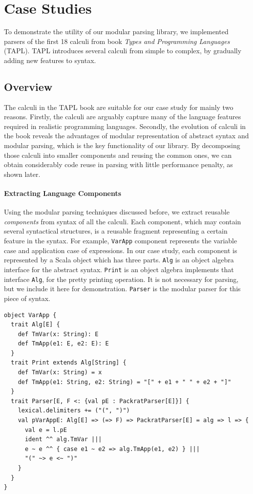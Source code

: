 \section{Case Studies}\label{sec:casestudy}


To demonstrate the utility of our modular parsing library, we
implemented parsers of the first 18 calculi from book \textit{Types
  and Programming Languages} (TAPL). TAPL introduces several
calculi from simple to complex, by gradually adding new features to
syntax. 

\subsection{Overview}\label{subsec:cs-overview}

The calculi in the TAPL book are suitable for our case study for mainly two reasons.
Firstly, the calculi are arguably capture many of the language features 
required in realistic programming languages. Secondly, the evolution of
calculi in the book reveals the advantages of modular representation
of abstract syntax and modular parsing, which is the key functionality
of our library. By decomposing those calculi into smaller components
and reusing the common ones, we can obtain considerably code reuse in
parsing with little performance penalty, as shown later.

\paragraph{Extracting Language Components}
Using the modular parsing techniques discussed before, we extract
reusable \textit{components} from syntax of all the calculi. Each
component, which may contain several syntactical structures, is a
reusable fragment representing a certain feature in the syntax. For
example, \lstinline{VarApp} component represents the variable case and
application case of expressions. In our case study, each component is
represented by a Scala object which has three parts. \lstinline{Alg}
is an object algebra interface for the abstract syntax.
\lstinline{Print} is an object algebra implements that interface
\lstinline{Alg}, for the pretty printing operation. It is not
necessary for parsing, but we include it here for demonstration.
\lstinline{Parser} is the modular parser for this piece of syntax.

\begin{lstlisting}
object VarApp {
  trait Alg[E] {
    def TmVar(x: String): E
    def TmApp(e1: E, e2: E): E
  }
  trait Print extends Alg[String] {
    def TmVar(x: String) = x
    def TmApp(e1: String, e2: String) = "[" + e1 + " " + e2 + "]"
  }
  trait Parser[E, F <: {val pE : PackratParser[E]}] {
    lexical.delimiters += ("(", ")")
    val pVarAppE: Alg[E] => (=> F) => PackratParser[E] = alg => l => {
      val e = l.pE
      ident ^^ alg.TmVar |||
      e ~ e ^^ { case e1 ~ e2 => alg.TmApp(e1, e2) } |||
      "(" ~> e <~ ")"
    }
  }
}
\end{lstlisting}

